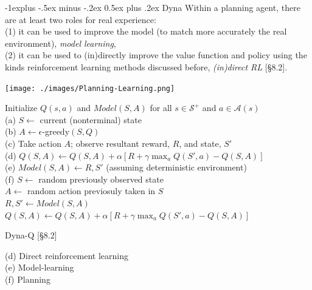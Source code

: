 \documentclass[10pt,landscape]{article}
\makeatletter
\renewcommand{\subsection}{\@startsection{subsection}{2}{0mm}%
                                {-1explus -.5ex minus -.2ex}%
                                {0.5ex plus .2ex}%
                                {\normalfont\normalsize\bfseries}}
\makeatother
\begin{document}
\begin{multicols}{3}
\subsection{Dyna}
Within a planning agent, there are at least two roles for real experience: \\
(1) it can be used to improve the model (to match more accurately the real environment), \emph{model learning},\\ 
(2) it can be used to (in)directly improve the value function and policy using the kinds reinforcement learning methods discussed before, \emph{(in)direct RL} [§8.2].\\
\begin{center}
\texttt{[image: ./images/Planning-Learning.png]}
\end{center}


\begin{algorithm}[H]
 Initialize $Q(s,a)$ and $Model(S,A)$ for all $s \in \mathcal{S}^+$ and $a \in \mathcal{A}(s)$\\
{
	(a) $S \leftarrow$ current (nonterminal) state \\
	(b) $A \leftarrow \epsilon$-greedy$(S, Q)$ \\
	(c) Take action $A$; observe resultant reward, $R$, and state, $S'$ \\
	(d) $Q(S, A) \leftarrow Q(S, A) + \alpha \left[R + \gamma \max_a Q(S', a) - Q(S, A)  \right]$ \\
	(e) $Model(S, A) \leftarrow R, S'$ (assuming deterministic environment) \\
	(f) 
	{
		$S \leftarrow$ random previously observed state \\
		$A \leftarrow$ random action previosuly taken in $S$\\
		$R, S' \leftarrow Model(S, A)$ \\
		$Q(S, A) \leftarrow Q(S, A) + \alpha \left[R + \gamma \max_a Q(S', a) - Q(S, A)  \right]$ \\
	}
 }
\caption{Dyna-Q [§8.2]}
\end{algorithm}

(d) Direct reinforcement learning\\
(e) Model-learning\\
(f) Planning


\end{multicols}
\end{document}
